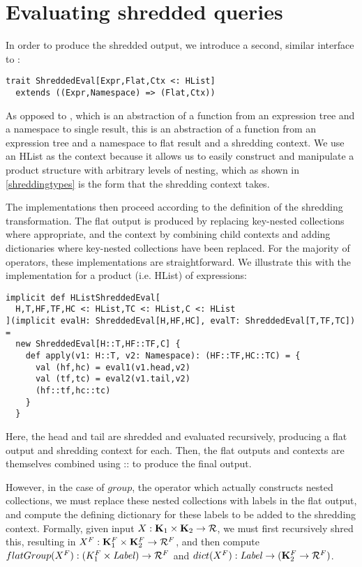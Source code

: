 \section{Evaluating shredded queries}

In order to produce the shredded output, we introduce a second, similar interface to :
\vs\begin{lstlisting}
trait ShreddedEval[Expr,Flat,Ctx <: HList]
  extends ((Expr,Namespace) => (Flat,Ctx))
\end{lstlisting}\vs
As opposed to , which is an abstraction of a function from an expression tree and a namespace to single result, this is an abstraction of a function from an expression tree and a namespace to flat result and a shredding context. We use an HList as the context because it allows us to easily construct and manipulate a product structure with arbitrary levels of nesting, which as shown in \ref{shreddingtypes} is the form that the shredding context takes.

The implementations then proceed according to the definition of the shredding transformation. The flat output is produced by replacing key-nested collections where appropriate, and the context by combining child contexts and adding dictionaries where key-nested collections have been replaced. For the majority of operators, these implementations are straightforward. We illustrate this with the implementation for a product (i.e. HList) of expressions:
\vs\begin{lstlisting}
implicit def HListShreddedEval[
  H,T,HF,TF,HC <: HList,TC <: HList,C <: HList
](implicit evalH: ShreddedEval[H,HF,HC], evalT: ShreddedEval[T,TF,TC]) =
  new ShreddedEval[H::T,HF::TF,C] {
    def apply(v1: H::T, v2: Namespace): (HF::TF,HC::TC) = {
      val (hf,hc) = eval1(v1.head,v2)
      val (tf,tc) = eval2(v1.tail,v2)
      (hf::tf,hc::tc)
    }
  }
\end{lstlisting}\vs
Here, the head and tail are shredded and evaluated recursively, producing a flat output and shredding context for each. Then, the flat outputs and contexts are themselves combined using :: to produce the final output.

However, in the case of $group$, the operator which actually constructs nested collections, we must replace these nested collections with labels in the flat output, and compute the defining dictionary for these labels to be added to the shredding context. Formally, given input $X: \mathbf{K}_1 \times \mathbf{K}_2 \rightarrow \mathcal{R}$, we must first recursively shred this, resulting in $X^F: \mathbf{K}_1^F \times \mathbf{K}_2^F \rightarrow \mathcal{R}^F$, and then compute $flatGroup(X^F): (K_1^F \times \textrm{\textit{Label}}) \rightarrow \mathcal{R}^F$ and $dict(X^F): \textrm{\textit{Label}} \rightarrow (\mathbf{K}_2^F \rightarrow \mathcal{R}^F)$.

